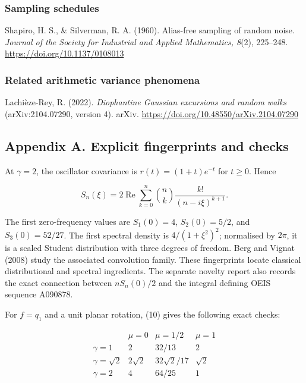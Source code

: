 \documentclass[
  british,
  11pt,
  a4paper,
]{article}
\begin{document}
\subsubsection{Sampling schedules}\label{sampling-schedules}

Shapiro, H. S., \& Silverman, R. A. (1960). Alias-free sampling of
random noise. \emph{Journal of the Society for Industrial and Applied
Mathematics, 8}(2), 225--248. \url{https://doi.org/10.1137/0108013}

\subsubsection{Related arithmetic variance
phenomena}\label{related-arithmetic-variance-phenomena}

Lachièze-Rey, R. (2022). \emph{Diophantine Gaussian excursions and
random walks} (arXiv:2104.07290, version 4). arXiv.
\url{https://doi.org/10.48550/arXiv.2104.07290}

\newpage

\subsection{Appendix A. Explicit fingerprints and
checks}\label{appendix-a.-explicit-fingerprints-and-checks}

At \(\gamma=2\), the oscillator covariance is \(r(t)=(1+t)e^{-t}\) for
\(t\ge0\). Hence

\[
S_n(\xi)=2\mathop{\mathrm{Re}}\sum_{k=0}^n\binom nk\frac{k!}{(n-i\xi)^{k+1}}. \tag{33}
\]

The first zero-frequency values are \(S_1(0)=4\), \(S_2(0)=5/2\), and
\(S_3(0)=52/27\). The first spectral density is \(4/(1+\xi^2)^2\);
normalised by \(2\pi\), it is a scaled Student distribution with three
degrees of freedom. Berg and Vignat (2008) study the associated
convolution family. These fingerprints locate classical distributional
and spectral ingredients. The separate novelty report also records the
exact connection between \(nS_n(0)/2\) and the integral defining OEIS
sequence A090878.

For \(f=q_1\) and a unit planar rotation, (10) gives the following exact
checks:

\[
\begin{array}{c|ccc}
&\mu=0&\mu=1/2&\mu=1\\\hline
\gamma=1&2&32/13&2\\
\gamma=\sqrt2&2\sqrt2&32\sqrt2/17&\sqrt2\\
\gamma=2&4&64/25&1
\end{array}
\]
\end{document}

